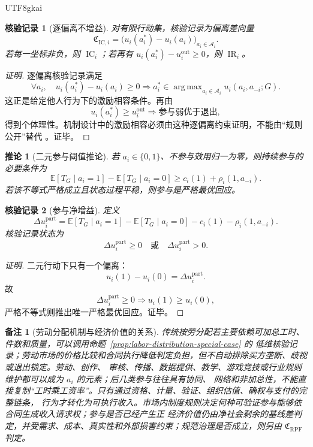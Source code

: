 \documentclass[12pt,a4paper,openany]{report}
\newtheorem{corollary}{推论}[chapter]
\newtheorem{remark}{备注}[chapter]
\newtheorem{Certificate}{核验记录}[chapter]
\newcommand{\EE}{\mathbb E}
\newcommand{\Act}{\mathcal A}
\DeclareMathOperator*{\argmax}{arg\,max}
\DeclareMathOperator{\IC}{IC}
\DeclareMathOperator{\IR}{IR}
\begin{document}
\begin{CJK*}{UTF8}{gkai}
\begin{Certificate}[逐偏离不增益]
对有限行动集，核验记录为偏离差向量
\[
  \mathfrak C_{\mathrm{IC},i}
  =
  \bigl(
  u_i(a_i^*)-u_i(a_i)
  \bigr)_{a_i\in\Act_i}.
\]
若每一坐标非负，则 \(\IC_i\)；若再有
\(u_i(a_i^*)-u_i^{\mathrm{out}}\ge0\)，则 \(\IR_i\)。
\end{Certificate}

\begin{proof}[证明]
逐偏离核验记录满足
\[
  \forall a_i,\quad
  u_i(a_i^*)-u_i(a_i)\ge0
  \Longrightarrow
  a_i^*\in\argmax_{a_i\in\Act_i}u_i(a_i,a_{-i};G).
\]
这正是给定他人行为下的激励相容条件。再由
\[
  u_i(a_i^*)\ge u_i^{\mathrm{out}}
  \Longrightarrow
  \text{参与弱优于退出},
\]
得到个体理性。机制设计中的激励相容必须由这种逐偏离约束证明，不能由“规则公开”替代
\cite{Myerson1981OptimalAuction}。证毕。
\end{proof}

\begin{corollary}[二元参与阈值推论]
\label{cor:binary-participation-threshold}
若 \(a_i\in\{0,1\}\)、不参与效用归一为零，则持续参与的必要条件为
\[
  \EE[T_G\mid a_i=1]-\EE[T_G\mid a_i=0]
  \ge
  c_i(1)+\rho_i(1,a_{-i}).
\]
若该不等式严格成立且状态过程平稳，则参与是严格最优回应。
\end{corollary}

\begin{Certificate}[参与净增益]
定义
\[
  \Delta u_i^{\mathrm{part}}
  =
  \EE[T_G\mid a_i=1]-\EE[T_G\mid a_i=0]
  -c_i(1)-\rho_i(1,a_{-i}).
\]
核验记录状态为
\[
  \Delta u_i^{\mathrm{part}}\ge0
  \quad\text{或}\quad
  \Delta u_i^{\mathrm{part}}>0.
\]
\end{Certificate}

\begin{proof}[证明]
二元行动下只有一个偏离：
\[
  u_i(1)-u_i(0)=\Delta u_i^{\mathrm{part}}.
\]
故
\[
  \Delta u_i^{\mathrm{part}}\ge0
  \Longrightarrow
  u_i(1)\ge u_i(0),
\]
严格不等式则推出唯一严格最优回应。证毕。
\end{proof}

\begin{remark}[劳动分配机制与经济价值的关系]
传统按劳分配若主要依赖可加总工时、件数和质量，可以调用命题~\ref{prop:labor-distribution-special-case} 的
低维核验记录；劳动市场的价格比较和合同执行降低判定负担，但不自动排除买方垄断、歧视或退出锁定。劳动、创作、
审核、传播、数据提供、教学、游戏竞技或行业规则维护都可以成为 \(a_i\) 的元素；后几类参与往往具有协同、
网络和非加总性，不能直接复制“工时乘工资率”。只有通过资格、计量、验证、组织估值、确权与支付的完整链条，
行为才转化为可执行收入。市场内制度规则决定何种可验证参与能够依合同生成收入请求权；参与是否已经产生正
经济价值仍由净社会剩余的基线差判定，并受需求、成本、真实性和外部损害约束；规范治理是否成立，则另由
\(\mathfrak C_{\mathrm{RPF}}\) 判定。
\end{remark}
\clearpage

\end{CJK*}
\end{document}
